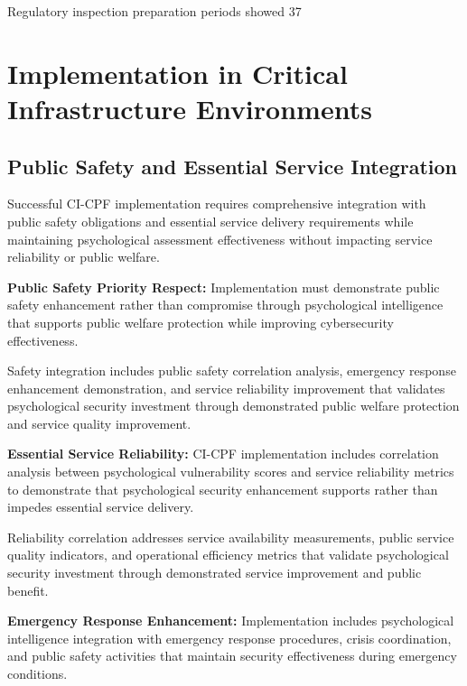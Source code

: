 \documentclass[10pt, twocolumn]{article}
\begin{document}
Regulatory inspection preparation periods showed 37%

\section{Implementation in Critical Infrastructure Environments}

\subsection{Public Safety and Essential Service Integration}

Successful CI-CPF implementation requires comprehensive integration with public safety obligations and essential service delivery requirements while maintaining psychological assessment effectiveness without impacting service reliability or public welfare.

\textbf{Public Safety Priority Respect:} Implementation must demonstrate public safety enhancement rather than compromise through psychological intelligence that supports public welfare protection while improving cybersecurity effectiveness.

Safety integration includes public safety correlation analysis, emergency response enhancement demonstration, and service reliability improvement that validates psychological security investment through demonstrated public welfare protection and service quality improvement.

\textbf{Essential Service Reliability:} CI-CPF implementation includes correlation analysis between psychological vulnerability scores and service reliability metrics to demonstrate that psychological security enhancement supports rather than impedes essential service delivery.

Reliability correlation addresses service availability measurements, public service quality indicators, and operational efficiency metrics that validate psychological security investment through demonstrated service improvement and public benefit.

\textbf{Emergency Response Enhancement:} Implementation includes psychological intelligence integration with emergency response procedures, crisis coordination, and public safety activities that maintain security effectiveness during emergency conditions.
\end{document}
